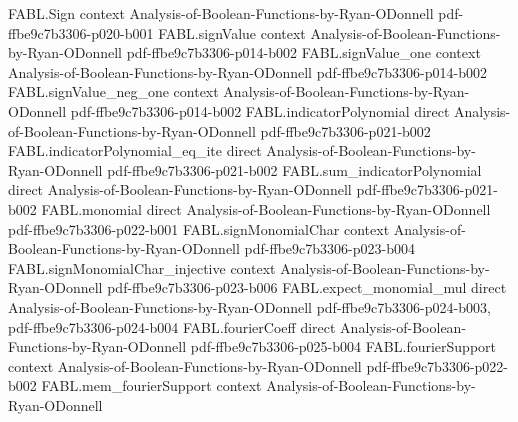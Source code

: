 \begin{theorem}
\label{FABL.expect_noiseOperator_kklNoiseRoot_fourth_le_sq_expect_sq}
\leanok
{}
\proofstep
  {FABL.Sign}
  {context}
  {Analysis-of-Boolean-Functions-by-Ryan-ODonnell}
  {pdf-ffbe9c7b3306-p020-b001}
\proofstep
  {FABL.signValue}
  {context}
  {Analysis-of-Boolean-Functions-by-Ryan-ODonnell}
  {pdf-ffbe9c7b3306-p014-b002}
\proofstep
  {FABL.signValue_one}
  {context}
  {Analysis-of-Boolean-Functions-by-Ryan-ODonnell}
  {pdf-ffbe9c7b3306-p014-b002}
\proofstep
  {FABL.signValue_neg_one}
  {context}
  {Analysis-of-Boolean-Functions-by-Ryan-ODonnell}
  {pdf-ffbe9c7b3306-p014-b002}
\proofstep
  {FABL.indicatorPolynomial}
  {direct}
  {Analysis-of-Boolean-Functions-by-Ryan-ODonnell}
  {pdf-ffbe9c7b3306-p021-b002}
\proofstep
  {FABL.indicatorPolynomial_eq_ite}
  {direct}
  {Analysis-of-Boolean-Functions-by-Ryan-ODonnell}
  {pdf-ffbe9c7b3306-p021-b002}
\proofstep
  {FABL.sum_indicatorPolynomial}
  {direct}
  {Analysis-of-Boolean-Functions-by-Ryan-ODonnell}
  {pdf-ffbe9c7b3306-p021-b002}
\proofstep
  {FABL.monomial}
  {direct}
  {Analysis-of-Boolean-Functions-by-Ryan-ODonnell}
  {pdf-ffbe9c7b3306-p022-b001}
\proofstep
  {FABL.signMonomialChar}
  {context}
  {Analysis-of-Boolean-Functions-by-Ryan-ODonnell}
  {pdf-ffbe9c7b3306-p023-b004}
\proofstep
  {FABL.signMonomialChar_injective}
  {context}
  {Analysis-of-Boolean-Functions-by-Ryan-ODonnell}
  {pdf-ffbe9c7b3306-p023-b006}
\proofstep
  {FABL.expect_monomial_mul}
  {direct}
  {Analysis-of-Boolean-Functions-by-Ryan-ODonnell}
  {pdf-ffbe9c7b3306-p024-b003,
    pdf-ffbe9c7b3306-p024-b004}
\proofstep
  {FABL.fourierCoeff}
  {direct}
  {Analysis-of-Boolean-Functions-by-Ryan-ODonnell}
  {pdf-ffbe9c7b3306-p025-b004}
\proofstep
  {FABL.fourierSupport}
  {context}
  {Analysis-of-Boolean-Functions-by-Ryan-ODonnell}
  {pdf-ffbe9c7b3306-p022-b002}
\proofstep
  {FABL.mem_fourierSupport}
  {context}
  {Analysis-of-Boolean-Functions-by-Ryan-ODonnell}

\end{theorem}
